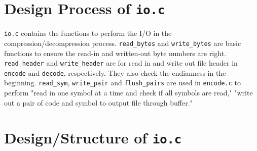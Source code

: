 \documentclass[12pt]{article}
\begin{document}
\section{Design Process of \texttt{io.c}}

\texttt{io.c} contains the functions to perform the I/O in the compression/decompression process. \texttt{read\_bytes} and \texttt{write\_bytes} are basic functions to ensure the read-in and written-out byte numbers are right. \texttt{read\_header} and \texttt{write\_header} are for read in and write out file header in \texttt{encode} and \texttt{decode}, respectively. They also check the endianness in the beginning. \texttt{read\_sym}, \texttt{write\_pair} and \texttt{flush\_pairs} are used in \texttt{encode.c} to perform "read in one symbol at a time and check if all symbols are read," "write out a pair of code and symbol to output file through buffer."
\\
\section{Design/Structure of \texttt{io.c}}
\end{document}
